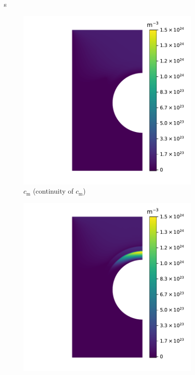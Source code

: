 \begin{figure}s
    \centering
    \begin{subfigure}{0.5\linewidth}
        \centering
        \includegraphics[width=\linewidth]{Figures/Chapter3/monoblocks/interface_condition/iter case/solute_c.pdf}
        \caption{$c_\mathrm{m}$ (continuity of $c_\mathrm{m}$)}
    \end{subfigure}%
    \begin{subfigure}{0.5\linewidth}
        \centering
        \includegraphics[width=\linewidth]{Figures/Chapter3/monoblocks/interface_condition/iter case/solute_mu.pdf}

\end{subfigure}
\end{figure}
